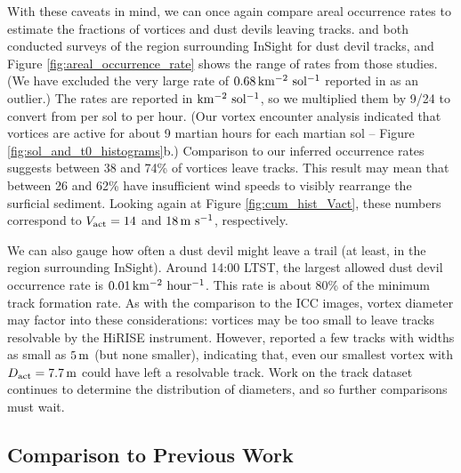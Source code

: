 \documentclass[linenumbers,trackchanges]{aastex63}
\begin{document}
With these caveats in mind, we can once again compare areal occurrence rates to estimate the fractions of vortices and dust devils leaving tracks. \citet{2016Icar..266..315R} and \citet{2020GeoRL..4787234P} both conducted surveys of the region surrounding InSight for dust devil tracks, and Figure \ref{fig:areal_occurrence_rate} shows the range of rates from those studies. (We have excluded the very large rate of $0.68\,{\rm km^{-2}\ sol^{-1}}$ reported in \citet{2020GeoRL..4787234P} as an outlier.) The rates are reported in ${\rm km^{-2}\ sol^{-1}}$, so we multiplied them by 9/24 to convert from per sol to per hour. (Our vortex encounter analysis indicated that vortices are active for about 9 martian hours for each martian sol -- Figure \ref{fig:sol_and_t0_histograms}b.) Comparison to our inferred occurrence rates suggests between 38 and 74\% of vortices leave tracks. This result may mean that between 26 and 62\% have insufficient wind speeds to visibly rearrange the surficial sediment. Looking again at Figure \ref{fig:cum_hist_Vact}, these numbers correspond to $V_{\rm act} = 14$ and $18\,{\rm m\ s^{-1}}$, respectively. 

We can also gauge how often a dust devil might leave a trail (at least, in the region surrounding InSight). Around 14:00 LTST, the largest allowed dust devil occurrence rate is $0.01\,{\rm km^{-2}\ hour^{-1}}$. This rate is about 80\% of the minimum track formation rate. As with the comparison to the ICC images, vortex diameter may factor into these considerations: vortices may be too small to leave tracks resolvable by the HiRISE instrument. However, \citet{2020GeoRL..4787234P} reported a few tracks with widths as small as $5\,{\rm m}$ (but none smaller), indicating that, even our smallest vortex with $D_{\rm act} = 7.7\,{\rm m}$ could have left a resolvable track. Work on the track dataset continues to determine the distribution of diameters, and so further comparisons must wait.

\subsection{Comparison to Previous Work}
\label{sec:Comparison to Previous Work}
\end{document}
